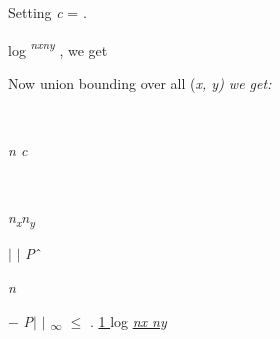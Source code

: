 \documentclass[12pt,twoside]{article}
\begin{document}
\vspace{\baselineskip}

\vspace{\baselineskip}
\begin{adjustwidth}{0.08in}{0.0in}
\begin{FlushLeft}
{\fontsize{10pt}{12.0pt}\selectfont Setting \textit{c }= . {\fontsize{7pt}{8.4pt} {\fontsize{10pt}{12.0pt}\selectfont log \textit{\textsuperscript{nxny} }, we get \tabto{3.51in} \uline{  \tabto{4.28in} }\par}\par}\par}
\end{FlushLeft}\par

\end{adjustwidth}


\vspace{\baselineskip}

\vspace{\baselineskip}

\vspace{\baselineskip}
\begin{multicols}{3}

\vspace{\baselineskip}

\vspace{\baselineskip}
{\fontsize{10pt}{12.0pt}\selectfont Now union bounding over all (\textit{x, y) we get:}\par}\par

\begin{FlushLeft}
\\
{\fontsize{10pt}{12.0pt}\textit{n \tabto{0.62in} c}\par}
\end{FlushLeft}\par

\begin{FlushLeft}
\\
{\fontsize{10pt}{12.0pt}\selectfont \textit{n\textsubscript{x}n\textsubscript{y}}\par}
\end{FlushLeft}\par


\vspace{\baselineskip}

\end{multicols}
\begin{adjustwidth}{0.57in}{1.09in}
\begin{Center}
{\fontsize{10pt}{12.0pt}\selectfont $ \vert $ $ \vert $ \textit{P}$ \string^ $ {\fontsize{7pt}{8.4pt}\selectfont \textit{n }{\fontsize{10pt}{12.0pt}\selectfont $-$  \textit{P}$ \vert $ $ \vert $ \textsubscript{$\infty$ } $ \leq $  . \uline{ 1 } log \textit{\uline{nx ny}}\par}\par}\par}
\end{Center}\par

\end{adjustwidth}
\end{document}
